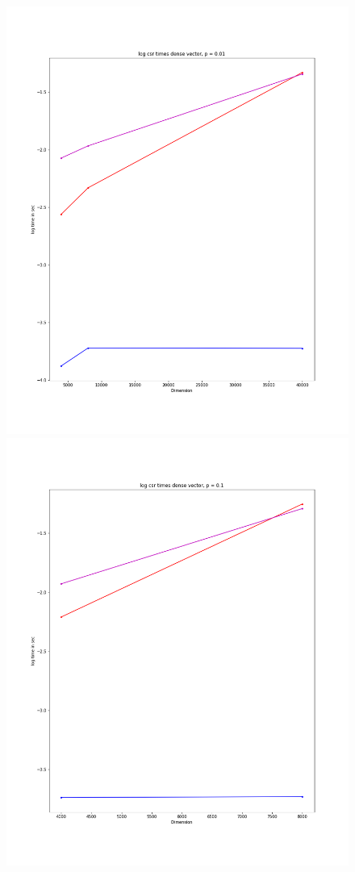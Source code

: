 \documentclass[12pt]{article}
\begin{document}
\begin{figure}[h]
  \includegraphics[scale = 0.16]{log_csr_dv_01.png}
  \includegraphics[scale = 0.16]{log_csr_dv_1.png}

\end{figure}

\pagebreak 
\end{document}
